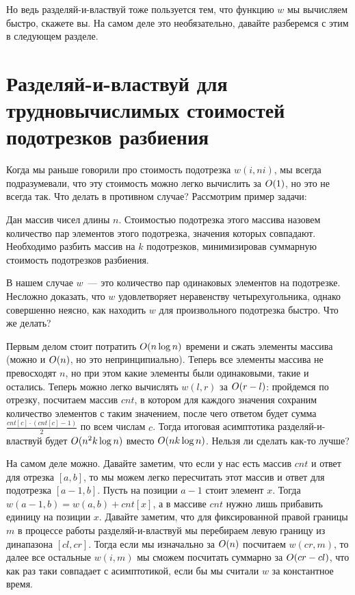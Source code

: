 Но ведь разделяй-и-властвуй тоже пользуется тем, что функцию $w$ мы вычисляем быстро, скажете вы. На самом деле это необязательно, давайте разберемся с этим в следующем разделе.

\section{Разделяй-и-властвуй для трудновычислимых стоимостей подотрезков разбиения}

Когда мы раньше говорили про стоимость подотрезка $w(i, ni)$, мы всегда подразумевали, что эту стоимость можно легко вычислить за $O(1)$, но это не всегда так. Что делать в противном случае? Рассмотрим пример задачи:

\begin{problem}
    Дан массив чисел длины $n$. Стоимостью подотрезка этого массива назовем количество пар элементов этого подотрезка, значения которых совпадают. Необходимо разбить массив на $k$ подотрезков, минимизировав суммарную стоимость подотрезков разбиения.
\end{problem}

В нашем случае $w$~--- это количество пар одинаковых элементов на подотрезке. Несложно доказать, что $w$ удовлетворяет неравенству четырехугольника, однако совершенно неясно, как находить $w$ для произвольного подотрезка быстро. Что же делать?

Первым делом стоит потратить $O(n \log n)$ времени и сжать элементы массива (можно и $O(n)$, но это непринципиально). Теперь все элементы массива не превосходят $n$, но при этом какие элементы были одинаковыми, такие и остались. Теперь можно легко вычислять $w(l, r)$ за $O(r - l)$: пройдемся по отрезку, посчитаем массив $cnt$, в котором для каждого значения сохраним количество элементов с таким значением, после чего ответом будет сумма $\frac{cnt[c] \cdot (cnt[c] - 1)}{2}$ по всем числам $c$. Тогда итоговая асимптотика разделяй-и-властвуй будет $O(n^2 k \log n)$ вместо $O(n k \log n)$. Нельзя ли сделать как-то лучше?

На самом деле можно. Давайте заметим, что если у нас есть массив $cnt$ и ответ для отрезка $[a, b]$, то мы можем легко пересчитать этот массив и ответ для подотрезка $[a - 1, b]$. Пусть на позиции $a - 1$ стоит элемент $x$. Тогда $w(a - 1, b) = w(a, b) + cnt[x]$, а в массиве $cnt$ нужно лишь прибавить единицу на позиции $x$. Давайте заметим, что для фиксированной правой границы $m$ в процессе работы разделяй-и-властвуй мы перебираем левую границу из динапазона $[cl, cr]$. Тогда если мы изначально за $O(n)$ посчитаем  $w(cr, m)$, то далее все остальные $w(i, m)$ мы сможем посчитать суммарно за $O(cr - cl)$, что как раз таки совпадает с асимптотикой, если бы мы считали $w$ за константное время.

